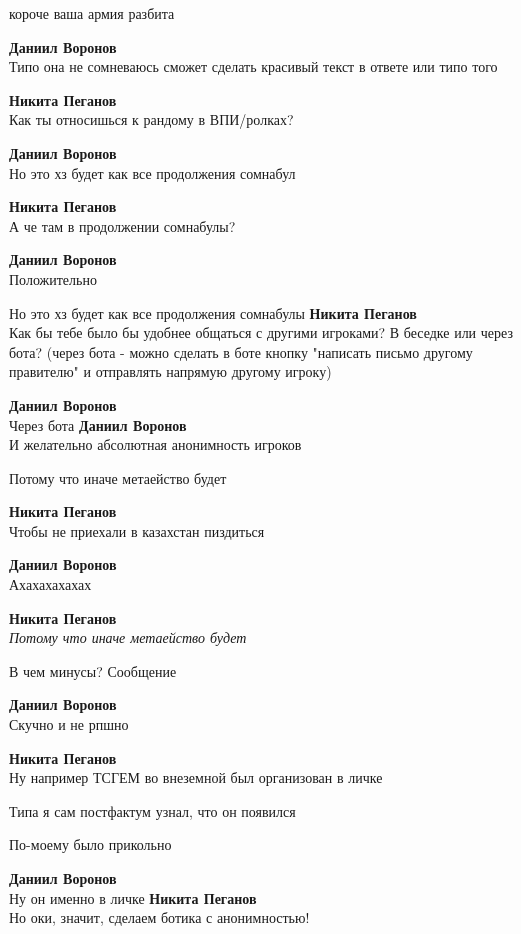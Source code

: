 \begin{tabbing}
короче ваша армия разбита

\textbf{Даниил Воронов} \\
Типо она не сомневаюсь сможет сделать красивый текст в ответе или типо того

\textbf{Никита Пеганов} \\
Как ты относишься к рандому в ВПИ/ролках?

\textbf{Даниил Воронов} \\
Но это хз будет как все продолжения сомнабул

\textbf{Никита Пеганов} \\
А че там в продолжении сомнабулы?

\textbf{Даниил Воронов} \\
Положительно

Но это хз будет как все продолжения сомнабулы
\textbf{Никита Пеганов} \\
Как бы тебе было бы удобнее общаться с другими игроками? В беседке или через бота?
(через бота - можно сделать в боте кнопку "написать письмо другому правителю" и отправлять напрямую другому игроку)

\textbf{Даниил Воронов} \\
Через бота
\textbf{Даниил Воронов} \\
И желательно абсолютная анонимность игроков

Потому что иначе метаейство будет

\textbf{Никита Пеганов} \\
Чтобы не приехали в казахстан пиздиться

\textbf{Даниил Воронов} \\
Ахахахахахах

\textbf{Никита Пеганов} \\
\textit{Потому что иначе метаейство будет}

В чем минусы? Сообщение

\textbf{Даниил Воронов} \\
Скучно и не рпшно

\textbf{Никита Пеганов} \\
Ну например ТСГЕМ во внеземной был организован в личке

Типа я сам постфактум узнал, что он появился

По-моему было прикольно

\textbf{Даниил Воронов} \\
Ну он именно в личке
\textbf{Никита Пеганов} \\
Но оки, значит, сделаем ботика с анонимностью!


\end{tabbing}
